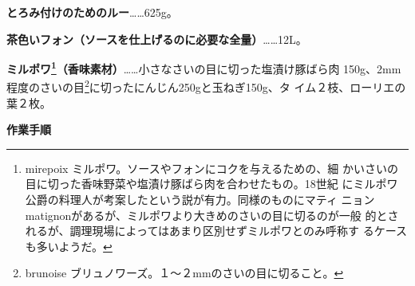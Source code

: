 \documentclass[twoside,12Q,b5paper]{escoffierltjsbook}
\newenvironment{recette}{\begin{multicols}{2}}{\end{multicols}}
\begin{document}
\begin{recette}
\textbf{とろみ付けのためのルー}\ldots{}\ldots{}625g。

\textbf{茶色いフォン（ソースを仕上げるのに必要な全量）}\ldots{}\ldots{}12L。

\textbf{ミルポワ\footnote{mirepoix
  ミルポワ。ソースやフォンにコクを与えるための、細
  かいさいの目に切った香味野菜や塩漬け豚ばら肉を合わせたもの。18世紀
  にミルポワ公爵の料理人が考案したという説が有力。同様のものにマティ
  ニョンmatignonがあるが、ミルポワより大きめのさいの目に切るのが一般
  的とされるが、調理現場によってはあまり区別せずミルポワとのみ呼称す
  るケースも多いようだ。}（香味素材）}\ldots{}\ldots{}小さなさいの目に切った塩漬け豚ばら肉
150g、2mm程度のさいの目\footnote{brunoise
  ブリュノワーズ。１〜２mmのさいの目に切ること。}に切ったにんじん250gと玉ねぎ150g、タ
イム２枝、ローリエの葉２枚。

\textbf{作業手順}


\end{recette}
\end{document}
